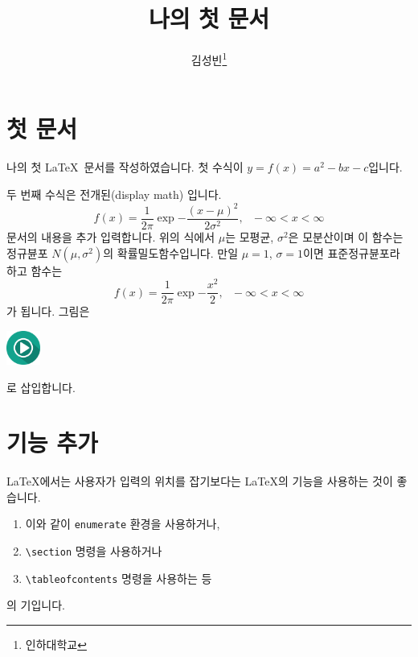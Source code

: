 \documentclass[11pt]{article}
\title{나의 첫 문서}
\author{김성빈\thanks{인하대학교}}
\begin{document}
\maketitle
\tableofcontents
\section{첫 문서}
나의 첫 \LaTeX\ 문서를 작성하였습니다. 첫 수식이 $y=f(x)=a^2 - bx - c$입니다.

두 번째 수식은 전개된(display math) 입니다.
\begin{equation}
f(x) = \frac{1}{2\pi} \exp{-\frac{(x-\mu)^2}{2\sigma^2}}, \ \ \ -\infty < x < \infty
\end{equation}
문서의 내용을 추가 입력합니다.
위의 식에서 $\mu$는 모평균, $\sigma^2$은 모분산이며 이 함수는 정규뷴포 $N(\mu, \sigma^2)$의 확률밀도함수입니다. 만일 $\mu=1$, $\sigma=1$이면 표준정규뷴포라 하고 함수는
\begin{equation}
f(x) = \frac{1}{2\pi} \exp{-\frac{x^2}{2}}, \ \ \ -\infty < x < \infty
\end{equation}
가 됩니다. 그림은
\begin{center}
\includegraphics[width=3em]{../images/play.png}
\end{center}
로 삽입합니다.
\section{기능 추가}
\LaTeX 에서는 사용자가 입력의 위치를 잡기보다는 \LaTeX 의 기능을 사용하는 것이 좋습니다.
\begin{enumerate}
\item 이와 같이 \texttt{enumerate} 환경을 사용하거나,
\item \verb|\section| 명령을 사용하거나
\item \verb|\tableofcontents| 명령을 사용하는 등
\end{enumerate}
의 기입니다.
\end{document}
